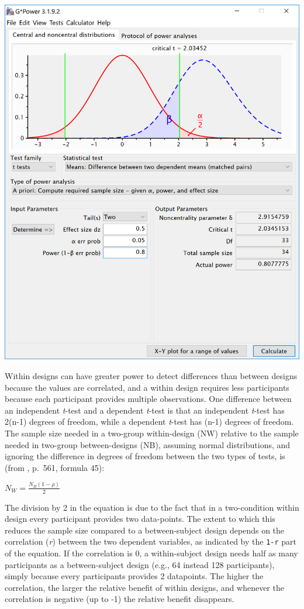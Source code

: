 \documentclass[
]{book}
\begin{document}
\includegraphics{screenshots/gpower_9.png}

Within designs can have greater power to detect differences than between designs because the values are correlated, and a within design requires less participants because each participant provides multiple observations. One difference between an independent \emph{t}-test and a dependent \emph{t}-test is that an independent \emph{t}-test has 2(n-1) degrees of freedom, while a dependent \emph{t}-test has (n-1) degrees of freedom. The sample size needed in a two-group within-design (NW) relative to the sample needed in two-group between-designs (NB), assuming normal distributions, and ignoring the difference in degrees of freedom between the two types of tests, is (from \citet{maxwell_designing_2004}, p.~561, formula 45):

\(N_{W}=\frac{N_{B}(1-\rho)}{2}\)

The division by 2 in the equation is due to the fact that in a two-condition within design every participant provides two data-points. The extent to which this reduces the sample size compared to a between-subject design depends on the correlation (\emph{r}) between the two dependent variables, as indicated by the \texttt{1-r} part of the equation. If the correlation is 0, a within-subject design needs half as many participants as a between-subject design (e.g., 64 instead 128 participants), simply because every participants provides 2 datapoints. The higher the correlation, the larger the relative benefit of within designs, and whenever the correlation is negative (up to -1) the relative benefit disappears.
\end{document}
